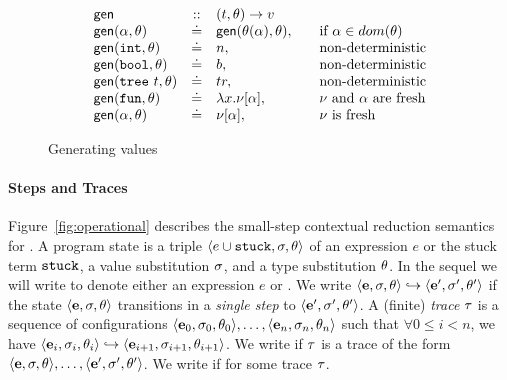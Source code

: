 \begin{figure}[ht]
$$
\begin{array}{lcll}
\gensym       & ::  & (t, \tsu) \rightarrow v \\
\gen{\thole}{\tsu}  & \defeq  & \gen{\subst{\tsu}{\thole}}{\tsu}, & \quad \text{if } \thole \in dom(\tsu) \\
\gen{\tint}{\tsu}   & \defeq  & n, & \quad \text{non-deterministic} \\
\gen{\tbool}{\tsu}  & \defeq  & b, & \quad \text{non-deterministic} \\
\gen{\ttree{t}}{\tsu}  & \defeq  & tr, & \quad \text{non-deterministic} \\
\gen{\tfun}{\tsu}   & \defeq & \efun{x}{\vhole{\thole}}, & \quad \text{\ehole and \thole are fresh} \\
\gen{\thole}{\tsu}  & \defeq & \vhole{\thole}, & \quad \text{\ehole is fresh} \\
\end{array}
$$
\caption{Generating values}
\label{fig:gen}
\end{figure}


\paragraph{Steps and Traces}

%
Figure~\ref{fig:operational} describes the small-step contextual
reduction semantics for \lang.
%
A program state is a triple $\langle e \cup \mathtt{stuck}, \sigma, \theta \rangle$ of an
expression $e$ or the stuck term $\mathtt{stuck}$, a value substitution $\sigma$,
and a type substitution $\theta$. In the sequel we will write \estuck to
denote either an expression $e$ or \stuck.
%
We write $\langle \mathbf{e}, \sigma, \theta \rangle \hookrightarrow \langle \mathbf{e}', \sigma', \theta' \rangle$ if the state
$\langle \mathbf{e}, \sigma, \theta \rangle$ transitions in a \emph{single step} to
$\langle \mathbf{e}', \sigma', \theta' \rangle$.
%
A (finite) \emph{trace} $\tau$ is a sequence of configurations
$\langle \mathbf{e}_0, \sigma_0, \theta_0 \rangle, \ldots, \langle \mathbf{e}_n, \sigma_n, \theta_n \rangle$ such that
$\forall 0 \leq i < n$, we have
$\langle \mathbf{e}_i, \sigma_i, \theta_i \rangle \hookrightarrow \langle \mathbf{e}_{i+1}, \sigma_{i+1}, \theta_{i+1} \rangle$.
%
We write  if $\tau$ is
a trace of the form $\langle \mathbf{e}, \sigma, \theta \rangle,\ldots,\langle \mathbf{e}', \sigma', \theta' \rangle$.
%
We write  if
 for some trace $\tau$.

